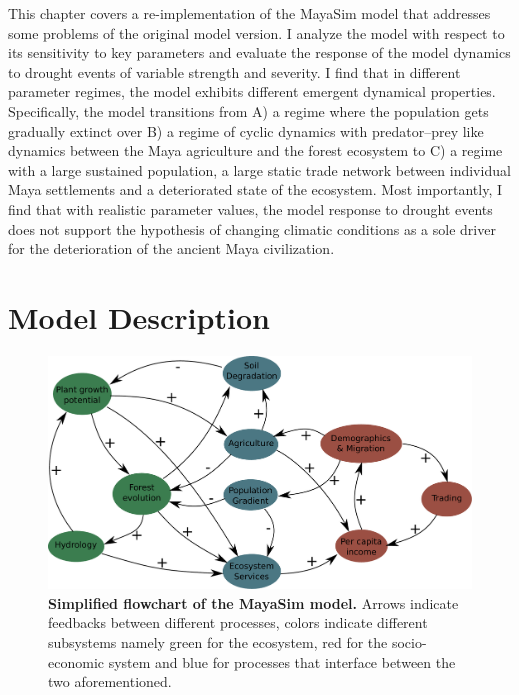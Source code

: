 This chapter covers a re-implementation of the MayaSim model that addresses some problems of the original model version. I analyze the model with respect to its sensitivity to key parameters and evaluate the response of the model dynamics to drought events of variable strength and severity. I find that in different parameter regimes, the model exhibits different emergent dynamical properties. Specifically, the model transitions from A) a regime where the population gets gradually extinct over B) a regime of cyclic dynamics with predator--prey like dynamics between the Maya agriculture and the forest ecosystem to C) a regime with a large sustained population, a large static trade network between individual Maya settlements and a deteriorated state of the ecosystem. Most importantly, I find that with realistic parameter values, the model response to drought events does not support the hypothesis of changing climatic conditions as a sole driver for the deterioration of the ancient Maya civilization.

\section{Model Description}


\begin{figure}
    \centering
    \includegraphics[width=.9 \textwidth]{figures/model_flowchart.pdf}
    \caption[Flowchart of the MayaSim model]{\textbf{Simplified flowchart of the MayaSim model.} Arrows indicate feedbacks between different processes, colors indicate different subsystems namely green for the ecosystem, red for the socio-economic system and blue for processes that interface between the two aforementioned.}
    \label{fig:my_label}
\end{figure}

